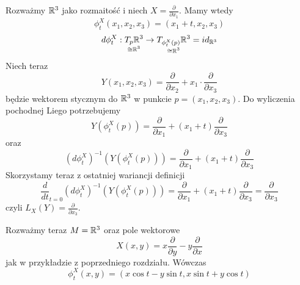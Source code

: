 \begin{example}
  \item Rozważmy $\mathbb{R}^3$ jako rozmaitość i niech $X=\frac{\partial}{\partial x_1}$. Mamy wtedy
    $$\phi_t^X(x_1,x_2,x_3)=(x_1+t,x_2,x_3)$$
    $$d\phi_t^X:\underset{\scriptstyle\cong\mathbb{R}^3}{T_p\mathbb{R}^3}\to \underset{\scriptstyle\cong\mathbb{R}^3}{T_{\phi_t^X(p)}\mathbb{R}^3} = id_{\mathbb{R}^3}$$
    Niech teraz 
    $$Y(x_1,x_2,x_3)=\frac{\partial}{\partial x_2}+x_1\cdot\frac{\partial}{\partial x_3}$$ 
    będzie wektorem stycznym do $\mathbb{R}^3$ w punkcie $p=(x_1,x_2,x_3)$. Do wyliczenia pochodnej Liego potrzebujemy
    $$Y(\phi_t^X(p))=\frac{\partial}{\partial x_1}+(x_1+t)\frac{\partial}{\partial x_3}$$
    oraz
    $$(d\phi_t^X)^{-1}(Y(\phi_t^X(p)))=\frac{\partial}{\partial x_1}+(x_1+t)\frac{\partial}{\partial x_3}$$
    Skorzystamy teraz z ostatniej wariancji definicji
    $$\frac{d}{dt}_{t=0}(d\phi_t^X)^{-1}(Y(\phi_t^X(p)))=\frac{\partial}{\partial x_1}+(x_1+t)\frac{\partial}{\partial x_3}=\frac{\partial}{\partial x_3}$$
    czyli $L_X(Y)=\frac{\partial}{\partial x_3}$.
    
    \begin{center}\end{center}

\item Rozważmy teraz $M=\mathbb{R}^3$ oraz pole wektorowe 
  $$X(x, y)=x\frac{\partial}{\partial y}-y\frac{\partial}{\partial x}$$
  jak w przykładzie z poprzedniego rozdziału. Wówczas 
  $$\phi_t^X(x, y)=(x\cos t-y\sin t, x\sin t+y\cos t)$$

\begin{illustration}
\begin{axis}[
    xmin = -3, xmax = 3,
    ymin = -3, ymax = 3,
    zmin = 0, zmax = 1,
    axis equal image,
    axis lines = middle,
    xtick distance = 1,
    ytick distance = 1,
    ticks = none,
    view = {0}{90},
    scale = 1.25,
    height=7cm,
    colormap/viridis,
]
 

\end{axis}
\end{illustration}
\end{example}
